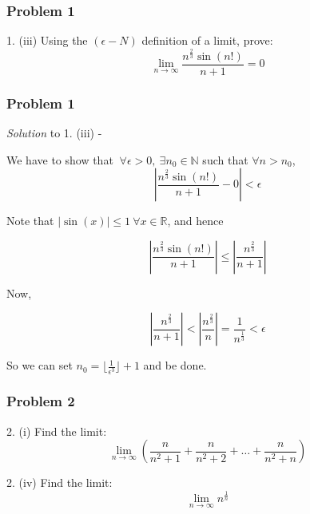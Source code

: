 \documentclass[
	11pt, %
]{beamer}
\begin{document}


\begin{frame}
	\frametitle{Problem 1}
	
	\begin{block}{1. (iii)}
		Using the $(\epsilon-N)$ definition of a limit, prove:
		\[ \lim _ {n \to \infty} \frac{n^\frac23 \sin{(n!)}}{n + 1} = 0\]

	\end{block}
	
\end{frame}

\begin{frame}[t]
	\frametitle{Problem 1}

	\textit{Solution} to 1. (iii) -

	\bigskip
	
	We have to show that $~ \forall \epsilon > 0, ~ \exists n_0 \in \mathbb{N}$ such that $\forall n > n_0$, 
	\[ \left | \frac{n^\frac23 \sin{(n!)}}{n + 1} - 0 \right | < \epsilon\]

	Note that $|\sin{(x)}| \leq 1 ~ \forall x \in \mathbb{R}$, and hence

	\[ \left | \frac{n^\frac23 \sin{(n!)}}{n + 1} \right | \leq \left | \frac{n^\frac23}{n + 1} \right | \]

	Now,

	\[\left | \frac{n^\frac23}{n + 1} \right | < \left | \frac{n^\frac23}{n} \right | = \frac{1}{n^\frac13} < \epsilon\]

	So we can set $n_0 = \lfloor \frac{1}{\epsilon^3} \rfloor + 1$ and be done.
\end{frame}

\begin{frame}
	\frametitle{Problem 2}
	
	\begin{block}{2. (i)}
		Find the limit:
		\[ \lim _ {n \to \infty} \left ( \frac{n}{n^2+1} + \frac{n}{n^2 + 2} + \dots + \frac{n}{n^2 + n} \right )\]
	\end{block}

	\begin{block}{2. (iv)}
		Find the limit:
		\[ \lim _ {n \to \infty} n^{\frac{1}{n}}\]
	\end{block}
	
\end{frame}
\end{document}
